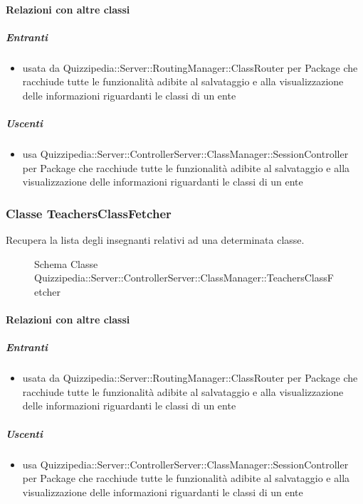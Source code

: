 \paragraph{Relazioni con altre classi}
\subparagraph{Entranti}
\begin{itemize}
\item usata da Quizzipedia::Server::RoutingManager::ClassRouter per Package che racchiude tutte le funzionalità adibite al salvataggio e alla visualizzazione delle informazioni riguardanti le classi di un ente
\end{itemize}
\subparagraph{Uscenti}
\begin{itemize}
\item usa Quizzipedia::Server::ControllerServer::ClassManager::SessionController per Package che racchiude tutte le funzionalità adibite al salvataggio e alla visualizzazione delle informazioni riguardanti le classi di un ente
\end{itemize}
\subsubsection{Classe TeachersClassFetcher}
Recupera la lista degli insegnanti relativi ad una determinata classe.
\begin{figure}[H]
\centering
\noindent{}
\caption[Schema Classe TeachersClassFetcher]{Schema Classe Quizzipedia::Server::ControllerServer::ClassManager::TeachersClassFetcher}
\end{figure}
\paragraph{Relazioni con altre classi}
\subparagraph{Entranti}
\begin{itemize}
\item usata da Quizzipedia::Server::RoutingManager::ClassRouter per Package che racchiude tutte le funzionalità adibite al salvataggio e alla visualizzazione delle informazioni riguardanti le classi di un ente
\end{itemize}
\subparagraph{Uscenti}
\begin{itemize}
\item usa Quizzipedia::Server::ControllerServer::ClassManager::SessionController per Package che racchiude tutte le funzionalità adibite al salvataggio e alla visualizzazione delle informazioni riguardanti le classi di un ente
\end{itemize}
